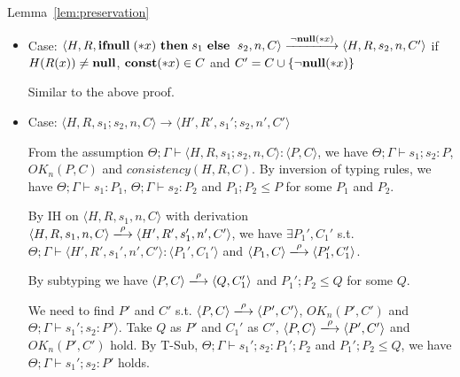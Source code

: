 \begin{pfof}{Lemma~\ref{lem:preservation}}
\begin{itemize}
  We need to find \(P'\) and \(C'\) such that \(\Theta;\Gamma \vdash
  s_1 \COL P'\), \( \langle P, C \rangle \xLongrightarrow{\snull}
  \langle P', C' \rangle\), \(\OK_n(P', C'\)) and \(consistency(H, R,
  C')\). Take \(Q\) as \(P'\) and \(C\cup \{\snull\}\) as \(C'\). Then
  \( \langle P,C \rangle \xlongrightarrow{\snull} \langle P', c'
  \rangle\) holds, and then \(\OK_n(P', C')\) and \(consistency(H, R,
  C')\)hold by Lemma~\ref{lem:okPreserved} and
  Lemma~\ref{lem:consistency}.  We also have \(\Theta; \Gamma \vdash
  s_1 \COL P'\) from , \(\Theta; \Gamma \vdash s_1 \COL
  P_1\) and \( P_1 \le Q\).

\item Case: \(\langle H, R, \IFNULL \Sirx \ \THEN s_{1} \ \ELSE
    \ s_{2}, n, C\rangle \xlongrightarrow{\snnull} \langle H, R, s_{2}, n, C'
    \rangle\) if \(H(R(x)) \neq \mathbf{null}\), \(\mathbf{const}(*x) \in C\) and \(C'
    = C \cup \{\neg{\bf null}(*x)\}\)

  Similar to the above proof.

\item Case: \(\langle H, R, s_1;s_2, n, C\rangle \rightarrow \langle
  H', R', s_1';s_2, n', C' \rangle \)

  From the assumption \(\Theta; \Gamma \vdash \langle H, R, s_1;s_2,
  n, C \rangle : \langle P, C \rangle\), we have \(\Theta; \Gamma
  \vdash s_1;s_2 : P\), \(OK_n(P, C)\) and \(consistency(H, R,
  C)\). By inversion of typing rules, we have \(\Theta; \Gamma \vdash
  s_1: P_1\), \(\Theta; \Gamma \vdash s_2: P_2\) and \(P_1;P_2 \le P\)
  for some \(P_1\) and \(P_2\).

  By IH on \( \langle H, R, s_1, n, C \rangle \) with derivation \(
  \langle H, R, s_1, n, C \rangle \xlongrightarrow{\rho} \langle H',
  R', s_1', n', C' \rangle\), we have \(\exists P_1',C_1'\)
  s.t. \(\Theta; \Gamma \vdash \langle H', R', s_1', n', C' \rangle :
  \langle P_1', C_1' \rangle\) and \( \langle P_1, C \rangle
  \xlongrightarrow{\rho} \langle P_1', C_1' \rangle\).

  By subtyping we have \( \langle P, C \rangle \xlongrightarrow{\rho}
  \langle Q, C_1' \rangle \) and \(P_1';P_2 \le Q\) for some \(Q\).

  We need to find \(P'\) and \(C'\) s.t. \( \langle P, C \rangle
  \xlongrightarrow{\rho} \langle P', C' \rangle \), \( OK_n(P', C')\)
  and \(\Theta; \Gamma \vdash s_1';s_2 : P' \rangle\).  Take \(Q\) as
  \(P'\) and \(C_1'\) as \(C'\), \( \langle P, C \rangle
  \xlongrightarrow{\rho} \langle P', C' \rangle \) and \( OK_n(P',
  C')\) hold. By T-Sub, \(\Theta; \Gamma \vdash s_1';s_2 : P_1';P_2\)
  and \(P_1';P_2 \le Q\), we have \(\Theta; \Gamma \vdash s_1';s_2 :
  P'\) holds.

\end{itemize}
\end{pfof}  


